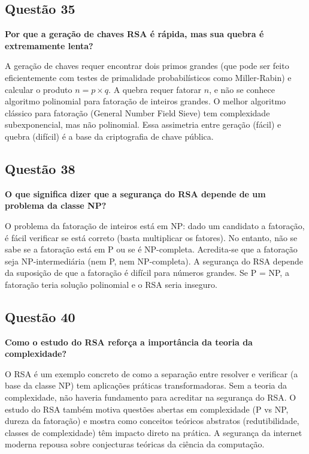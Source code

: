 \documentclass[conference]{IEEEtran}
\begin{document}
\subsection{Questão 35}
\textbf{Por que a geração de chaves RSA é rápida, mas sua quebra é extremamente lenta?}

A geração de chaves requer encontrar dois primos grandes (que pode ser feito eficientemente com testes de primalidade probabilísticos como Miller-Rabin) e calcular o produto $n = p \times q$. A quebra requer fatorar $n$, e não se conhece algoritmo polinomial para fatoração de inteiros grandes. O melhor algoritmo clássico para fatoração (General Number Field Sieve) tem complexidade subexponencial, mas não polinomial. Essa assimetria entre geração (fácil) e quebra (difícil) é a base da criptografia de chave pública.

\subsection{Questão 38}
\textbf{O que significa dizer que a segurança do RSA depende de um problema da classe NP?}

O problema da fatoração de inteiros está em NP: dado um candidato a fatoração, é fácil verificar se está correto (basta multiplicar os fatores). No entanto, não se sabe se a fatoração está em P ou se é NP-completa. Acredita-se que a fatoração seja NP-intermediária (nem P, nem NP-completa). A segurança do RSA depende da suposição de que a fatoração é difícil para números grandes. Se P = NP, a fatoração teria solução polinomial e o RSA seria inseguro.

\subsection{Questão 40}
\textbf{Como o estudo do RSA reforça a importância da teoria da complexidade?}

O RSA é um exemplo concreto de como a separação entre resolver e verificar (a base da classe NP) tem aplicações práticas transformadoras. Sem a teoria da complexidade, não haveria fundamento para acreditar na segurança do RSA. O estudo do RSA também motiva questões abertas em complexidade (P vs NP, dureza da fatoração) e mostra como conceitos teóricos abstratos (redutibilidade, classes de complexidade) têm impacto direto na prática. A segurança da internet moderna repousa sobre conjecturas teóricas da ciência da computação.
\end{document}

